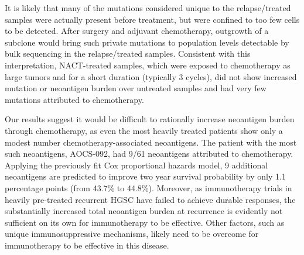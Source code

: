 \documentclass[linenumbers]{bmcart}
\begin{document}

It is likely that many of the mutations considered unique to the relapse/treated samples were actually present before treatment, but were confined to too few cells to be detected. After surgery and adjuvant chemotherapy, outgrowth of a subclone would bring such private mutations to population levels detectable by bulk sequencing in the relapse/treated samples. Consistent with this interpretation, NACT-treated samples, which were exposed to chemotherapy as large tumors and for a short duration (typically 3 cycles), did not show increased mutation or neoantigen burden over untreated samples and had very few mutations attributed to chemotherapy.



Our results suggest it would be difficult to rationally increase neoantigen burden through chemotherapy, as even the most heavily treated patients show only a modest number chemotherapy-associated neoantigens. The patient with the most such neoantigens, AOCS-092, had 9/61 neoantigens attributed to chemotherapy. Applying the previously fit Cox proportional hazards model, 9 additional neoantigens are predicted to improve two year survival probability by only 1.1 percentage points (from 43.7\% to 44.8\%). Moreover, as immunotherapy trials in heavily pre-treated recurrent HGSC have failed to achieve durable responses, the substantially increased total neoantigen burden at recurrence is evidently not sufficient on its own for immunotherapy to be effective. Other factors, such as unique immunosuppressive mechanisms, likely need to be overcome for immunotherapy to be effective in this disease.
\end{document}
